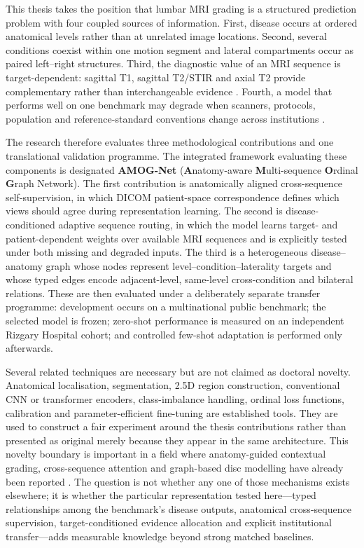 This thesis takes the position that lumbar MRI grading is a structured prediction
problem with four coupled sources of information. First, disease occurs at ordered
anatomical levels rather than at unrelated image locations. Second, several
conditions coexist within one motion segment and lateral compartments occur as
paired left--right structures. Third, the diagnostic value of an MRI sequence is
target-dependent: sagittal T1, sagittal T2/STIR and axial T2 provide complementary
rather than interchangeable evidence \cite{hallinan2021deep}. Fourth, a model that
performs well on one benchmark may degrade when scanners, protocols, population and
reference-standard conventions change across institutions
\cite{mcsweeney2023external,zhang2023deep,guan2022domain}.

The research therefore evaluates three methodological contributions and one
translational validation programme. The integrated framework evaluating these components
is designated \textbf{AMOG-Net} (\textbf{A}natomy-aware \textbf{M}ulti-sequence \textbf{O}rdinal \textbf{G}raph Network). The first contribution is anatomically aligned cross-sequence
self-supervision, in which DICOM patient-space correspondence defines which views
should agree during representation learning. The second is disease-conditioned
adaptive sequence routing, in which the model learns target- and patient-dependent
weights over available MRI sequences and is explicitly tested under both missing
and degraded inputs. The third is a heterogeneous disease--anatomy graph whose
nodes represent level--condition--laterality targets and whose typed edges encode
adjacent-level, same-level cross-condition and bilateral relations. These are then
evaluated under a deliberately separate transfer programme: development occurs on
a multinational public benchmark; the selected model is frozen; zero-shot
performance is measured on an independent Rizgary Hospital cohort; and controlled
few-shot adaptation is performed only afterwards.

Several related techniques are necessary but are not claimed as doctoral novelty.
Anatomical localisation, segmentation, 2.5D region construction, conventional CNN
or transformer encoders, class-imbalance handling, ordinal loss functions,
calibration and parameter-efficient fine-tuning are established tools. They are
used to construct a fair experiment around the thesis contributions rather than
presented as original merely because they appear in the same architecture. This
novelty boundary is important in a field where anatomy-guided contextual grading,
cross-sequence attention and graph-based disc modelling have already been reported
\cite{chai2026anatomy,nguyen2026crossspine,baur2024automated}. The question is not
whether any one of those mechanisms exists elsewhere; it is whether the particular
representation tested here---typed relationships among the benchmark's disease
outputs, anatomical cross-sequence supervision, target-conditioned evidence
allocation and explicit institutional transfer---adds measurable knowledge beyond
strong matched baselines.

